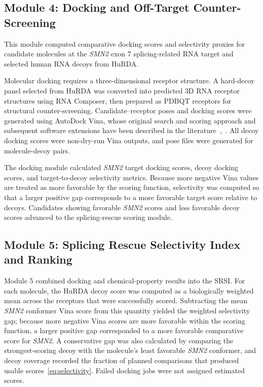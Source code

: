 \documentclass[journal]{IEEEtran}
\begin{document}
\subsection{Module 4: Docking and Off-Target Counter-Screening}

This module computed comparative docking scores and selectivity proxies
for candidate molecules at the \textit{SMN2} exon 7 splicing-related RNA
target and selected human RNA decoys from HuRDA.

Molecular docking requires a three-dimensional receptor structure. A
hard-decoy panel selected from HuRDA was converted into predicted 3D RNA
receptor structures using RNA Composer, then prepared as PDBQT
receptors for structural counter-screening. Candidate--receptor poses
and docking scores were generated using AutoDock Vina, whose original
search and scoring approach and subsequent software extensions have been
described in the literature~\cite{trott2010},~\cite{eberhardt2021}. All
decoy docking scores were non-dry-run Vina outputs, and pose files were
generated for molecule-decoy pairs.

The docking module calculated \textit{SMN2} target docking scores, decoy
docking scores, and target-to-decoy selectivity metrics. Because more
negative Vina values are treated as more favorable by the scoring
function, selectivity was computed so that a larger positive gap
corresponds to a more favorable target score relative to decoys.
Candidates showing favorable \textit{SMN2} scores and less favorable
decoy scores advanced to the splicing-rescue scoring module.

\subsection{Module 5: Splicing Rescue Selectivity Index and Ranking}

Module 5 combined docking and chemical-property results into the SRSI.
For each molecule, the HuRDA decoy score was computed as a biologically
weighted mean across the receptors that were successfully scored.
Subtracting the mean \textit{SMN2} conformer Vina score from this
quantity yielded the weighted selectivity gap; because more negative
Vina scores are more favorable within the scoring function, a larger
positive gap corresponded to a more favorable comparative score for
\textit{SMN2}. A conservative gap was also calculated by comparing the
strongest-scoring decoy with the molecule's least favorable
\textit{SMN2} conformer, and decoy coverage recorded the fraction of
planned comparisons that produced usable scores~\eqref{eq:selectivity}.
Failed docking jobs were not assigned estimated scores.
\end{document}
